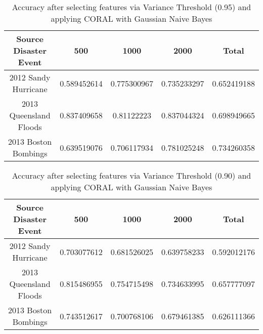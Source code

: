 \begin{table}[ht]
    \begin{center}
    \caption{Accuracy after selecting features via Variance Threshold (0.95) and applying CORAL with Gaussian Naive Bayes}
    \begin{tabular}[c]{|c|c|c|c|c|}
        \hline
        Source Disaster Event & 500 & 1000 & 2000 & Total \\
        \hline
        2012 Sandy Hurricane & 0.589452614 & 0.775300967 & 0.735233297 & 0.652419188 \\
        2013 Queensland Floods & 0.837409658 & 0.81122223 & 0.837044324 & 0.698949665 \\
        2013 Boston Bombings & 0.639519076 & 0.706117934 & 0.781025248 & 0.734260358 \\
        \hline
    \end{tabular}
    \label{tablevar95}
   \end{center}
\end{table}

\begin{table}[ht]
    \begin{center}
    \caption{Accuracy after selecting features via Variance Threshold (0.90) and applying CORAL with Gaussian Naive Bayes}
    \begin{tabular}[c]{|c|c|c|c|c|}
        \hline
        Source Disaster Event & 500 & 1000 & 2000 & Total \\
        \hline
        2012 Sandy Hurricane & 0.703077612 & 0.681526025 & 0.639758233 & 0.592012176 \\
        2013 Queensland Floods & 0.815486955 & 0.754715498 & 0.734633995 & 0.657777097 \\
        2013 Boston Bombings & 0.743512617 & 0.700768106 & 0.679461385 & 0.626111366 \\
        \hline
    \end{tabular}
    \label{tablevar9}
   \end{center}
\end{table}

